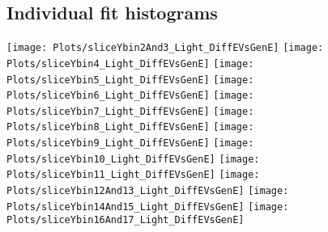 \documentclass[a4paper,10pt]{article}
\begin{document}
\subsection{Individual fit histograms} 
\texttt{[image: Plots/sliceYbin2And3\_Light\_DiffEVsGenE]} 
\texttt{[image: Plots/sliceYbin4\_Light\_DiffEVsGenE]} 
\texttt{[image: Plots/sliceYbin5\_Light\_DiffEVsGenE]} 
\texttt{[image: Plots/sliceYbin6\_Light\_DiffEVsGenE]} 
\texttt{[image: Plots/sliceYbin7\_Light\_DiffEVsGenE]} 
\texttt{[image: Plots/sliceYbin8\_Light\_DiffEVsGenE]} 
\texttt{[image: Plots/sliceYbin9\_Light\_DiffEVsGenE]} 
\texttt{[image: Plots/sliceYbin10\_Light\_DiffEVsGenE]} 
\texttt{[image: Plots/sliceYbin11\_Light\_DiffEVsGenE]} 
\texttt{[image: Plots/sliceYbin12And13\_Light\_DiffEVsGenE]} 
\texttt{[image: Plots/sliceYbin14And15\_Light\_DiffEVsGenE]} 
\texttt{[image: Plots/sliceYbin16And17\_Light\_DiffEVsGenE]} 
 
\end{document}
